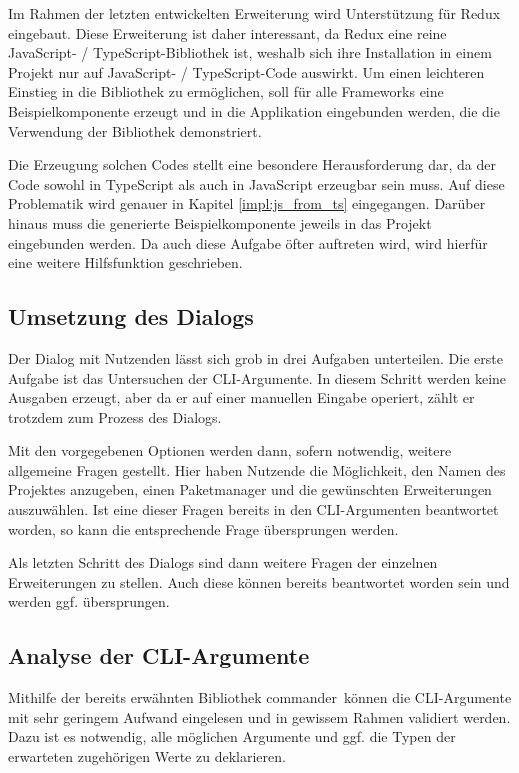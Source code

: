 Im Rahmen der letzten entwickelten Erweiterung wird Unterstützung für Redux eingebaut. Diese Erweiterung ist daher interessant, da Redux eine reine JavaScript- / TypeScript-Bibliothek ist, weshalb sich ihre Installation in einem Projekt nur auf JavaScript- / TypeScript-Code auswirkt. Um einen leichteren Einstieg in die Bibliothek zu ermöglichen, soll für alle Frameworks eine Beispielkomponente erzeugt und in die Applikation eingebunden werden, die die Verwendung der Bibliothek demonstriert.

Die Erzeugung solchen Codes stellt eine besondere Herausforderung dar, da der Code sowohl in TypeScript als auch in JavaScript erzeugbar sein muss. Auf diese Problematik wird genauer in Kapitel \ref{impl:js_from_ts} eingegangen. Darüber hinaus muss die generierte Beispielkomponente jeweils in das Projekt eingebunden werden. Da auch diese Aufgabe öfter auftreten wird, wird hierfür eine weitere Hilfsfunktion geschrieben.

\subsection{Umsetzung des Dialogs}
Der Dialog mit Nutzenden lässt sich grob in drei Aufgaben unterteilen. Die erste Aufgabe ist das Untersuchen der \gls{CLI}-Argumente. In diesem Schritt werden keine Ausgaben erzeugt, aber da er auf einer manuellen Eingabe operiert, zählt er trotzdem zum Prozess des Dialogs.

Mit den vorgegebenen Optionen werden dann, sofern notwendig, weitere allgemeine Fragen gestellt. Hier haben Nutzende die Möglichkeit, den Namen des Projektes anzugeben, einen Paketmanager und die gewünschten Erweiterungen auszuwählen. Ist eine dieser Fragen bereits in den \gls{CLI}-Argumenten beantwortet worden, so kann die entsprechende Frage übersprungen werden.

Als letzten Schritt des Dialogs sind dann weitere Fragen der einzelnen Erweiterungen zu stellen. Auch diese können bereits beantwortet worden sein und werden ggf. übersprungen.

\subsection{Analyse der CLI-Argumente}
Mithilfe der bereits erwähnten Bibliothek \glqq commander\grqq\ können die \gls{CLI}-Argumente mit sehr geringem Aufwand eingelesen und in gewissem Rahmen validiert werden. Dazu ist es notwendig, alle möglichen Argumente und ggf. die Typen der erwarteten zugehörigen Werte zu deklarieren.

